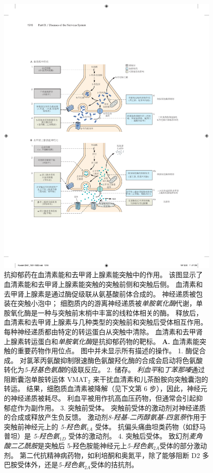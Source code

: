 \begin{figure}[htbp] \label{fig:61_7}
	\centering
	\includegraphics[width=0.7\linewidth]{chap61/fig_61_7}
	\caption{抗抑郁药在血清素能和去甲肾上腺素能突触中的作用。
	该图显示了血清素能和去甲肾上腺素能突触的突触前侧和突触后侧。
	血清素和去甲肾上腺素是通过酶促级联从氨基酸前体合成的。
	神经递质被包装在突触小泡中；
	细胞质内的游离神经递质被\textit{单胺氧化酶}代谢，单胺氧化酶是一种与突触前末梢中丰富的线粒体相关的酶。
	释放后，血清素和去甲肾上腺素与几种类型的突触前和突触后受体相互作用。
	每种神经递质都由特定的转运蛋白从突触中清除。
	血清素和去甲肾上腺素转运蛋白和\textit{单胺氧化酶}是抗抑郁药物的靶标。
	\textbf{A.} 血清素能突触的重要药物作用位点。
	图中并未显示所有描述的操作。
	1. 酶促合成。
	对氯苯丙氨酸抑制限速酶色氨酸羟化酶的合成会启动将色氨酸转化为\textit{5-羟基色氨酸}的级联反应。
	2. 储存。
	\textit{利血平}和\textit{丁苯那嗪}通过阻断囊泡单胺转运体 VMAT$_2$ 来干扰血清素和儿茶酚胺向突触囊泡的转运。
	结果，细胞质血清素被降解（见下文第 6 步），因此，神经元的神经递质被耗尽。
	利血平被用作抗高血压药物，但通常会引起抑郁症作为副作用。
	3. 突触前受体。
	突触前受体的激动剂对神经递质的合成或释放产生负反馈。
	激动剂\textit{8-羟基-二丙醇氨基-四氢萘}作用于突触前神经元上的 \textit{5-羟色氨}$_{1A}$ 受体。
	抗偏头痛曲坦类药物（如舒马普坦）是 \textit{5-羟色氨}$_{1D}$ 受体的激动剂。
	4. 突触后受体。
	致幻剂\textit{麦角酸二乙酰胺}是突触后 5-羟色胺能神经元上\textit{5-羟色氨}$_{2A}$受体的部分激动剂。
	第二代抗精神病药物，如利培酮和奥氮平，除了能够阻断 D2 多巴胺受体外，还是\textit{5-羟色氨}$_{2A}$受体的拮抗剂。
}
\end{figure}
